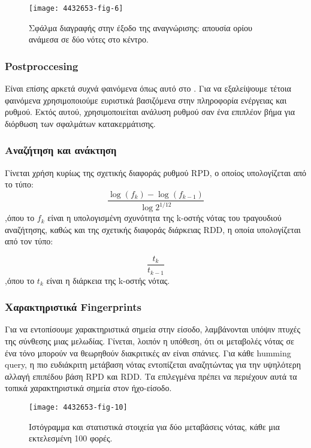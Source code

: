 \begin{figure}
        \centering
        \texttt{[image: 4432653-fig-6]}
        \caption{Σφάλμα διαγραφής στην έξοδο της αναγνώρισης: απουσία ορίου ανάμεσα σε δύο νότες στο κέντρο.}
        \label{fig:4432653-fig-6}
\end{figure}

\subsubsection{Postproccesing}
Είναι επίσης αρκετά συχνά φαινόμενα όπως αυτό στο . 
Για να εξαλείψουμε τέτοια φαινόμενα χρησιμοποιούμε ευριστικά βασιζόμενα στην πληροφορία ενέργειας και ρυθμού. Εκτός αυτού, χρησιμοποιείται ανάλυση ρυθμού σαν ένα επιπλέον βήμα για διόρθωση των σφαλμάτων κατακερμάτισης.

\subsubsection{Αναζήτηση και ανάκτηση}
Γίνεται χρήση κυρίως της σχετικής διαφοράς ρυθμού RPD, ο οποίος υπολογίζεται από το τύπο:
\begin{equation*}
\dfrac{\log(f_k)-\log(f_{k-1})}{\log2^{1/12}}
\end{equation*}
,όπου το $f_{k}$ είναι η υπολογισμένη σχυνότητα της k-οστής νότας του τραγουδιού αναζήτησης,
καθώς και της σχετικής διαφοράς διάρκειας RDD, η οποία υπολογίζεται από τον τύπο:

\begin{equation*}
\dfrac{t_k}{t_{k-1}}
\end{equation*}
,όπου το $t_{k}$ είναι η διάρκεια της k-οστής νότας.

\subsubsection{Χαρακτηριστικά Fingerprints}
Για να εντοπίσουμε χαρακτηριστικά σημεία στην είσοδο, λαμβάνονται υπόψιν πτυχές
της σύνθεσης μιας μελωδίας. Γίνεται, λοιπόν η υπόθεση, ότι οι μεταβολές νότας σε ένα τόνο μπορούν να θεωρηθούν διακριτικές αν είναι σπάνιες. Για κάθε humming query, η πιο ευδιάκριτη μετάβαση νότας εντοπίζεται αναζητώντας για την υψηλότερη αλλαγή επιπέδου βάση RPD και RDD. Τα επιλεγμένα \fps  πρέπει να περιέχουν αυτά τα τοπικά χαρακτηριστικά σημεία στον ήχο-είσοδο.

\begin{figure}
        \centering
        \texttt{[image: 4432653-fig-10]}
        \caption{Ιστόγραμμα και στατιστικά στοιχεία για δύο μεταβάσεις νότας, κάθε μια εκτελεσμένη 100 φορές.}
        \label{fig:4432653-fig-10}
\end{figure}
